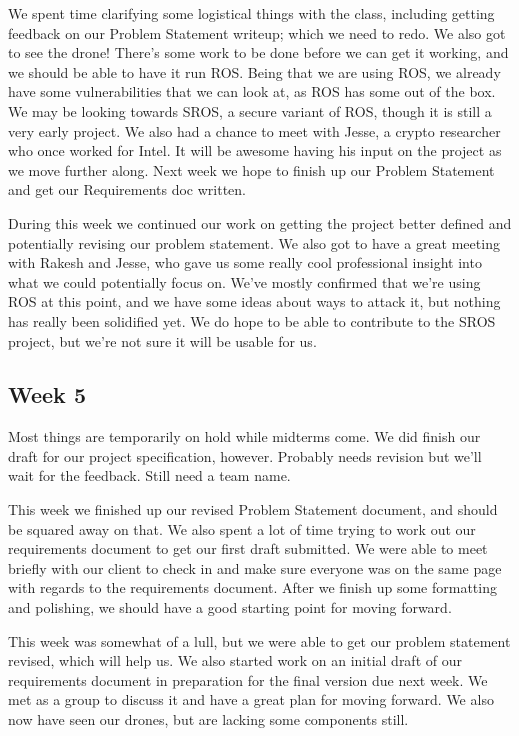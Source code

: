 \documentclass[IEEEtran,letterpaper,10pt,notitlepage,draftclsnofoot,onecolumn]{article}
\begin{document}
We spent time clarifying some logistical things with the class, including getting feedback on our Problem Statement writeup; which we need to redo. We also got to see the drone! There's some work to be done before we can get it working, and we should be able to have it run ROS. Being that we are using ROS, we already have some vulnerabilities that we can look at, as ROS has some out of the box. We may be looking towards SROS, a secure variant of ROS, though it is still a very early project. We also had a chance to meet with Jesse, a crypto researcher who once worked for Intel. It will be awesome having his input on the project as we move further along. Next week we hope to finish up our Problem Statement and get our Requirements doc written.

During this week we continued our work on getting the project better defined and potentially revising our problem statement. We also got to have a great meeting with Rakesh and Jesse, who gave us some really cool professional insight into what we could potentially focus on. We've mostly confirmed that we're using ROS at this point, and we have some ideas about ways to attack it, but nothing has really been solidified yet. We do hope to be able to contribute to the SROS project, but we're not sure it will be usable for us.

\subsection{Week 5}
Most things are temporarily on hold while midterms come. We did finish our draft for our project specification, however. Probably needs revision but we'll wait for the feedback. Still need a team name.

This week we finished up our revised Problem Statement document, and should be squared away on that. We also spent a lot of time trying to work out our requirements document to get our first draft submitted. We were able to meet briefly with our client to check in and make sure everyone was on the same page with regards to the requirements document. After we finish up some formatting and polishing, we should have a good starting point for moving forward.

This week was somewhat of a lull, but we were able to get our problem statement revised, which will help us. We also started work on an initial draft of our requirements document in preparation for the final version due next week. We met as a group to discuss it and have a great plan for moving forward. We also now have seen our drones, but are lacking some components still.
\end{document}
